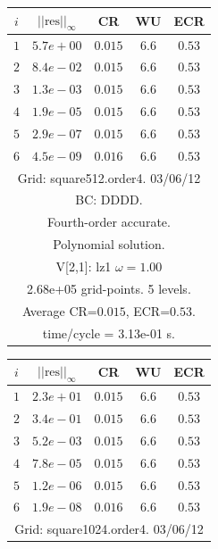 \begin{table}[hbt]
\begin{center}
{\tablefontsize
\begin{tabular}{|c|c|c|c|c|} \hline 
 $i$   & $\vert\vert\mbox{res}\vert\vert_\infty$  &  CR     &  WU    & ECR  \\   \hline 
 $ 1$  & $ 5.7e+00$ & $0.015$ & $ 6.6$ & $0.53$ \\ 
 $ 2$  & $ 8.4e-02$ & $0.015$ & $ 6.6$ & $0.53$ \\ 
 $ 3$  & $ 1.3e-03$ & $0.015$ & $ 6.6$ & $0.53$ \\ 
 $ 4$  & $ 1.9e-05$ & $0.015$ & $ 6.6$ & $0.53$ \\ 
 $ 5$  & $ 2.9e-07$ & $0.015$ & $ 6.6$ & $0.53$ \\ 
 $ 6$  & $ 4.5e-09$ & $0.016$ & $ 6.6$ & $0.53$ \\ 
\hline 
\multicolumn{5}{|c|}{Grid: square512.order4. 03/06/12}  \\
\multicolumn{5}{|c|}{BC: DDDD.}  \\
\multicolumn{5}{|c|}{Fourth-order accurate.}  \\
\multicolumn{5}{|c|}{Polynomial solution.}  \\
\multicolumn{5}{|c|}{V[2,1]: lz1 $\omega=1.00$}  \\
\multicolumn{5}{|c|}{2.68e+05 grid-points. 5 levels.}  \\
\multicolumn{5}{|c|}{Average CR=$0.015$, ECR=$0.53$.}  \\
\multicolumn{5}{|c|}{time/cycle = 3.13e-01 s.}  \\
\hline 
\end{tabular}
\begin{tabular}{|c|c|c|c|c|} \hline 
 $i$   & $\vert\vert\mbox{res}\vert\vert_\infty$  &  CR     &  WU    & ECR  \\   \hline 
 $ 1$  & $ 2.3e+01$ & $0.015$ & $ 6.6$ & $0.53$ \\ 
 $ 2$  & $ 3.4e-01$ & $0.015$ & $ 6.6$ & $0.53$ \\ 
 $ 3$  & $ 5.2e-03$ & $0.015$ & $ 6.6$ & $0.53$ \\ 
 $ 4$  & $ 7.8e-05$ & $0.015$ & $ 6.6$ & $0.53$ \\ 
 $ 5$  & $ 1.2e-06$ & $0.015$ & $ 6.6$ & $0.53$ \\ 
 $ 6$  & $ 1.9e-08$ & $0.016$ & $ 6.6$ & $0.53$ \\ 
\hline 
\multicolumn{5}{|c|}{Grid: square1024.order4. 03/06/12}  \\

\end{tabular}}
\end{center}
\end{table}

